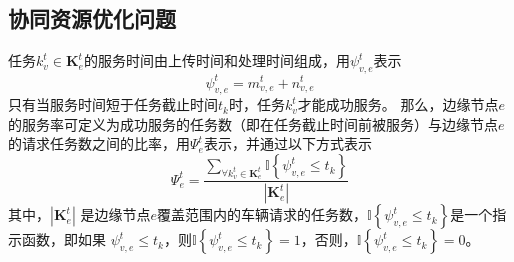 \subsection{协同资源优化问题}

任务$k_v^t \in \mathbf{K}_{e}^{t}$的服务时间由上传时间和处理时间组成，用$\psi_{v, e}^{t}$表示
\begin{equation}
	\psi_{v, e}^{t} = m_{v, e}^{t} +  n_{v, e}^{t}
	\label{equ 3-10}
\end{equation}
只有当服务时间短于任务截止时间$t_k$时，任务$k_v^t$才能成功服务。
那么，边缘节点$e$的服务率可定义为成功服务的任务数（即在任务截止时间前被服务）与边缘节点$e$的请求任务数之间的比率，用$\Psi_{e}^{t}$表示，并通过以下方式表示
\begin{equation}
	\Psi_{e}^{t} = \frac{\sum_{\forall k_{v}^{t} \in \mathbf{K}_{e}^{t}} \mathbb{I} \left\{ \psi_{v, e}^{t} \leq t_{k} \right\} }{|\mathbf{K}_{e}^{t}|}
	\label{equ 3-11}
\end{equation}
\noindent 其中，$|\mathbf{K}_{e}^{t}|$ 是边缘节点$e$覆盖范围内的车辆请求的任务数，$\mathbb{I} \left\{ \psi_{v, e}^{t} \leq t_{k} \right\}$是一个指示函数，即如果 $\psi_{v, e}^{t} \leq t_{k}$，则$\mathbb{I} \left\{ \psi_{v, e}^{t} \leq t_{k} \right\} =1$，否则，$\mathbb{I} \left\{ \psi_{v, e}^{t} \leq t_{k} \right\} =0$。

